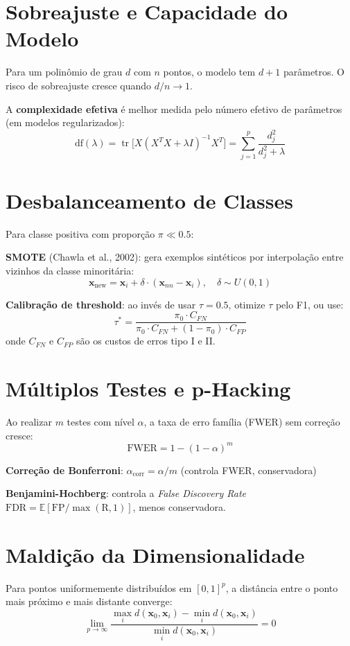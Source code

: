 \documentclass[12pt,a4paper,twoside]{book}
\theoremstyle{definition}
\theoremstyle{remark}
\newcommand{\E}{\mathbb{E}}
\newcommand{\bx}{\bm{x}}
\DeclareMathOperator{\tr}{tr}
\begin{document}
\section{Sobreajuste e Capacidade do Modelo}

Para um polinômio de grau $d$ com $n$ pontos, o modelo tem $d+1$ parâmetros. O risco de sobreajuste cresce quando $d/n \to 1$.

A \textbf{complexidade efetiva} é melhor medida pelo número efetivo de parâmetros (em modelos regularizados):
\[
\mathrm{df}(\lambda) = \tr\!\bigl[X(X^TX + \lambda I)^{-1}X^T\bigr] = \sum_{j=1}^p \frac{d_j^2}{d_j^2 + \lambda}
\]

\section{Desbalanceamento de Classes}

Para classe positiva com proporção $\pi \ll 0.5$:

\textbf{SMOTE} (Chawla et al., 2002): gera exemplos sintéticos por interpolação entre vizinhos da classe minoritária:
\[
\bx_{\text{new}} = \bx_i + \delta \cdot (\bx_{nn} - \bx_i), \quad \delta \sim U(0,1)
\]

\textbf{Calibração de threshold}: ao invés de usar $\tau = 0.5$, otimize $\tau$ pelo F1, ou use:
\[
\tau^* = \frac{\pi_0 \cdot C_{FN}}{\pi_0 \cdot C_{FN} + (1-\pi_0) \cdot C_{FP}}
\]
onde $C_{FN}$ e $C_{FP}$ são os custos de erros tipo I e II.

\section{Múltiplos Testes e p-Hacking}

Ao realizar $m$ testes com nível $\alpha$, a taxa de erro família (FWER) sem correção cresce:
\[
\mathrm{FWER} = 1 - (1-\alpha)^m
\]

\textbf{Correção de Bonferroni}: $\alpha_{\mathrm{corr}} = \alpha/m$ (controla FWER, conservadora)

\textbf{Benjamini-Hochberg}: controla a \textit{False Discovery Rate} $\mathrm{FDR} = \E[\mathrm{FP}/\max(\mathrm{R},1)]$, menos conservadora.

\section{Maldição da Dimensionalidade}

Para pontos uniformemente distribuídos em $[0,1]^p$, a distância entre o ponto mais próximo e mais distante converge:
\[
\lim_{p\to\infty} \frac{\max_i d(\bx_0, \bx_i) - \min_i d(\bx_0, \bx_i)}{\min_i d(\bx_0, \bx_i)} = 0
\]
\end{document}
